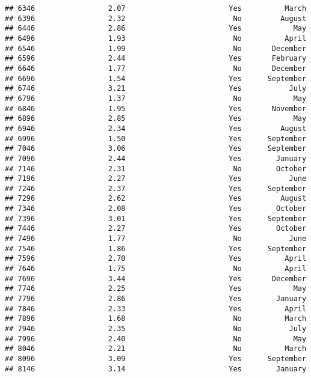 \documentclass[
]{article}
\begin{document}
\begin{verbatim}
## 6346                 2.07                        Yes          March
## 6396                 2.32                         No         August
## 6446                 2.86                        Yes            May
## 6496                 1.93                         No          April
## 6546                 1.99                         No       December
## 6596                 2.44                        Yes       February
## 6646                 1.77                         No       December
## 6696                 1.54                        Yes      September
## 6746                 3.21                        Yes           July
## 6796                 1.37                         No            May
## 6846                 1.95                        Yes       November
## 6896                 2.85                        Yes            May
## 6946                 2.34                        Yes         August
## 6996                 1.50                        Yes      September
## 7046                 3.06                        Yes      September
## 7096                 2.44                        Yes        January
## 7146                 2.31                         No        October
## 7196                 2.27                        Yes           June
## 7246                 2.37                        Yes      September
## 7296                 2.62                        Yes         August
## 7346                 2.08                        Yes        October
## 7396                 3.01                        Yes      September
## 7446                 2.27                        Yes        October
## 7496                 1.77                         No           June
## 7546                 1.86                        Yes      September
## 7596                 2.70                        Yes          April
## 7646                 1.75                         No          April
## 7696                 3.44                        Yes       December
## 7746                 2.25                        Yes            May
## 7796                 2.86                        Yes        January
## 7846                 2.33                        Yes          April
## 7896                 1.68                         No          March
## 7946                 2.35                         No           July
## 7996                 2.40                         No            May
## 8046                 2.21                         No          March
## 8096                 3.09                        Yes      September
## 8146                 3.14                        Yes        January

\end{verbatim}
\end{document}
